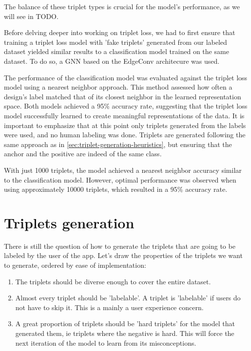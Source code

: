 The balance of these triplet types is crucial for the model's performance, as we will see in TODO.

Before delving deeper into working on triplet loss, we had to first ensure that training a triplet loss model with 'fake triplets' generated from our labeled dataset yielded similar results to a classification model trained on the same dataset. To do so, a GNN based on the EdgeConv architecure \cite{wangDynamicGraphCNN2019} was used. 

The performance of the classification model was evaluated against the triplet loss model using a nearest neighbor approach. This method assessed how often a design's label matched that of its closest neighbor in the learned representation space. Both models achieved a 95\% accuracy rate, suggesting that the triplet loss model successfully learned to create meaningful representations of the data. It is important to emphasize that at this point only triplets generated from the labels were used, and no human labeling was done. Triplets are generated following the same approach as in \autoref{sec:triplet-generation-heuristics}, but ensuring that the anchor and the positive are indeed of the same class. 

With just 1000 triplets, the model achieved a nearest neighbor accuracy similar to the classification model. However, optimal performance was observed when using approximately 10000 triplets, which resulted in a 95\% accuracy rate.

\section{Triplets generation}
\label{sec:triplet-generation}

There is still the question of how to generate the triplets that are going to be labeled by the user of the app. Let's draw the properties of the triplets we want to generate, ordered by ease of implementation:
\begin{enumerate}
  \item The triplets should be diverse enough to cover the entire dataset.
  \item Almost every triplet should be 'labelable'. A triplet is 'labelable' if users do not have to skip it. This is a mainly a user experience concern. 
  \item A great proportion of triplets should be 'hard triplets' for the model that generated them, ie triplets where the negative is hard. This will force the next iteration of the model to learn from its misconceptions.
\end{enumerate}


